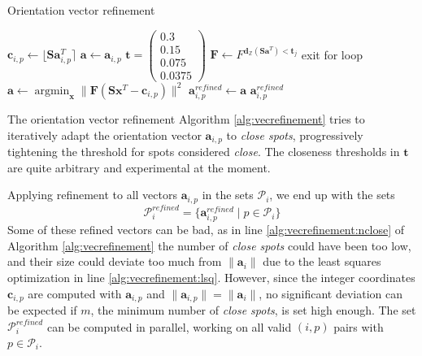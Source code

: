 \documentclass[a4paper,10pt]{article}
\DeclareMathOperator*{\argmin}{argmin}
\DeclareMathOperator{\trace}{trace}
\newcommand{\vect}[1]{\mathbf{#1}}
\newcommand{\mat}[1]{\mathbf{#1}}
\newcommand{\round}[1]{\lfloor #1 \rceil}
\newcommand{\distvecZ}[1]{\vect{d}_\mathbb{Z}(#1)}
\newcommand{\filter}[1]{F^{#1}}
\begin{document}
\begin{algorithm}
\caption{Orientation vector refinement}
\label{alg:vecrefinement}
\begin{algorithmic}[1]
\Function{vector-refinement}{$\vect{a}_{i,p},\mat{S},m$}
\State $\vect{c}_{i,p}\gets \round{\mat{S} \vect{a}_{i,p}^T}$
\State $\vect{a}\gets \vect{a}_{i,p}$
\State $\vect{t} = \begin{pmatrix}0.3 \\ 0.15 \\ 0.075 \\ 0.0375\end{pmatrix}$
  \State $\mat{F}\gets \filter{\distvecZ{\mat{S}\vect{a}^T} < \vect{t}_j}$
  \If{$\trace(\mat{F}) < m$}\label{alg:vecrefinement:nclose}
    \State exit for loop
  \EndIf
  \State $\vect{a}\gets \argmin_{\vect{x}} \| \mat{F}(\mat{S}\vect{x}^T - \vect{c}_{i,p}) \|^2$\label{alg:vecrefinement:lsq}
\EndFor
\State $\vect{a}_{i,p}^{refined}\gets \vect{a}$
\State \Return $\vect{a}_{i,p}^{refined}$
\EndFunction
\end{algorithmic}
\end{algorithm}

The orientation vector refinement Algorithm \ref{alg:vecrefinement} tries to iteratively adapt the orientation vector $\vect{a}_{i,p}$ to \emph{close spots}, progressively tightening the threshold for spots considered \emph{close}. The closeness thresholds in $\vect{t}$ are quite arbitrary and experimental at the moment.

Applying refinement to all vectors $\vect{a}_{i,p}$ in the sets $\mathcal{P}_i$, we end up with the sets
%
\[
 \mathcal{P}_i^{refined} = \{ \vect{a}_{i,p}^{refined} \mid p \in \mathcal{P}_i \}
\]
%
Some of these refined vectors can be bad, as in line \ref{alg:vecrefinement:nclose} of Algorithm \ref{alg:vecrefinement} the number of \emph{close spots} could have been too low, and their size could deviate too much from $\|\vect{a}_i\|$ due to the least squares optimization in line \ref{alg:vecrefinement:lsq}. However, since the integer coordinates $\vect{c}_{i,p}$ are computed with $\vect{a}_{i,p}$ and $\|\vect{a}_{i,p}\| = \|\vect{a}_i\|$, no significant deviation can be expected if $m$, the minimum number of \emph{close spots}, is set high enough.
The set $\mathcal{P}_i^{refined}$ can be computed in parallel, working on all valid $(i,p)$ pairs with $p\in \mathcal{P}_i$.
\end{document}
